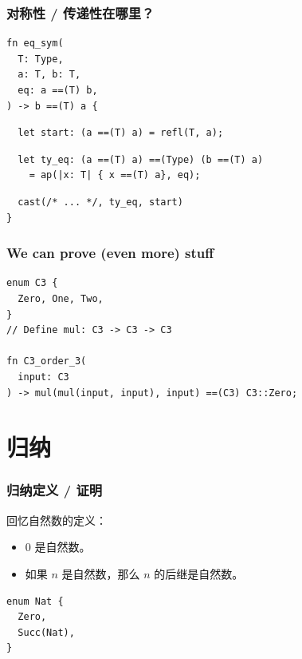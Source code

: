 \documentclass[UTF-8]{ctexbeamer}
\begin{document}
\begin{frame}[fragile]
  \frametitle{对称性 / 传递性在哪里？}

  \pause

  \begin{verbatim}
fn eq_sym(
  T: Type,
  a: T, b: T,
  eq: a ==(T) b,
) -> b ==(T) a {
  \end{verbatim}
  \pause
  \begin{verbatim}
  let start: (a ==(T) a) = refl(T, a);
  \end{verbatim}
  \pause
  \begin{verbatim}
  let ty_eq: (a ==(T) a) ==(Type) (b ==(T) a)
    = ap(|x: T| { x ==(T) a}, eq);
  \end{verbatim}
  \pause
  \begin{verbatim}
  cast(/* ... */, ty_eq, start)
}
  \end{verbatim}
\end{frame}

\begin{frame}[fragile]
  \frametitle{We can prove (even more) stuff}

  \begin{verbatim}
enum C3 {
  Zero, One, Two,
}
// Define mul: C3 -> C3 -> C3

fn C3_order_3(
  input: C3
) -> mul(mul(input, input), input) ==(C3) C3::Zero;
  \end{verbatim}
  

\end{frame}

\section{归纳}

\begin{frame}[fragile]
  \frametitle{归纳定义 / 证明}

  \pause

  回忆自然数的定义：
  \begin{itemize}
    \item 0 是自然数。
    \item 如果 $n$ 是自然数，那么 $n$ 的后继是自然数。
  \end{itemize}

  \pause

  \begin{verbatim}
enum Nat {
  Zero,
  Succ(Nat),
}
  \end{verbatim}
\end{frame}
\end{document}
